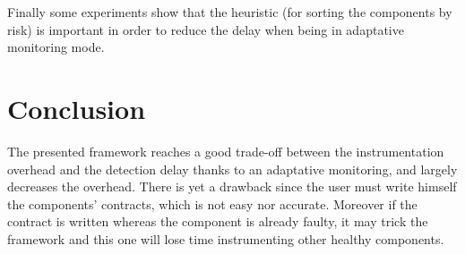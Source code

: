 Finally some experiments show that the heuristic (for sorting the components by risk) is important in order to reduce the delay when being in adaptative monitoring mode.

\section{Conclusion}

The presented framework reaches a good trade-off between the instrumentation overhead and the detection delay thanks to an adaptative monitoring, and largely decreases the overhead. There is yet a drawback since the user must write himself the components' contracts, which is not easy nor accurate. Moreover if the contract is written whereas the component is already faulty, it may trick the framework and this one will lose time instrumenting other healthy components. 
